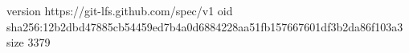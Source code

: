 version https://git-lfs.github.com/spec/v1
oid sha256:12b2dbd47885cb54459ed7b4a0d6884228aa51fb157667601df3b2da86f103a3
size 3379
